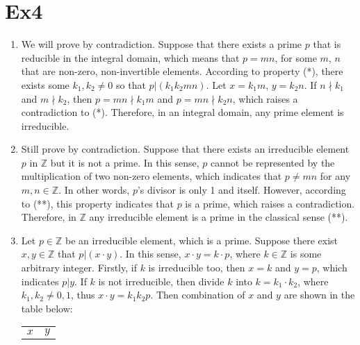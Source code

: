 \documentclass[12pt, a4paper]{article}
\begin{document}
\section*{Ex4}
\begin{enumerate}
    \item We will prove by contradiction.\newline
          Suppose that there exists a prime $p$ that is reducible in the integral domain, 
          which means that $p = mn$, for some $m$, $n$ that are non-zero, non-invertible elements. 
          According to property (*), there exists some $k_1, k_2 \neq 0$ so that $p|(k_1k_2mn)$. 
          Let $x = k_1m$, $y = k_2n$. If $n\nmid k_1$ and $m\nmid k_2$, then $p = mn\nmid k_1m$ 
          and $p = mn\nmid k_2n$, which raises a contradiction to (*).\newline
          Therefore, in an integral domain, any prime element is irreducible.
    \item Still prove by contradiction.\newline
          Suppose that there exists an irreducible element $p$ in $\mathbb{Z}$ but it is not a prime. 
          In this sense, $p$ cannot be represented by the multiplication of two non-zero elements, 
          which indicates that $p \neq mn$ for any $m, n\in \mathbb{Z}$. In other words, 
          $p$'s divisor is only 1 and itself. However, according to (**), 
          this property indicates that $p$ is a prime, which raises a contradiction.\newline
          Therefore, in $\mathbb{Z}$ any irreducible element is a prime in the classical sense (**).
    \item Let $p\in \mathbb{Z}$ be an irreducible element, which is a prime. 
          Suppose there exist $x, y\in \mathbb{Z}$ that $p | (x\cdot y)$. 
          In this sense, $x\cdot y = k\cdot p$, where $k\in \mathbb{Z}$ is some arbitrary integer.\newline
          Firstly, if $k$ is irreducible too, then $x = k$ and $y = p$, which indicates $p | y$.\newline
          If $k$ is not irreducible, then divide $k$ into $k = k_1\cdot k_2$, where $k_1, k_2 \neq 0, 1$, 
          thus $x\cdot y = k_1k_2p$. Then combination of $x$ and $y$ are shown in the table below:
          \begin{center}
                \begin{tabular}{c|c}
                      \hline
                      $x$ & $y$\\

\end{tabular}
\end{center}
\end{enumerate}
\end{document}

